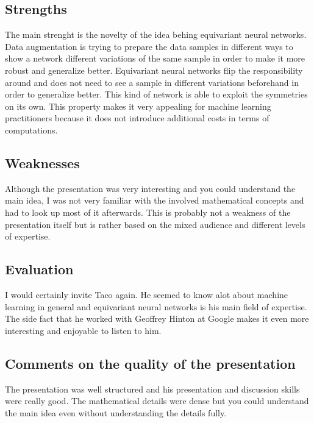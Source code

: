 \documentclass[a4paper]{article}
\begin{document}
\subsection{Strengths}

The main strenght is the novelty of the idea behing equivariant neural networks. Data augmentation is trying to prepare the data samples in different ways to show a network different variations of the same sample in order to make it more robust and generalize better. Equivariant neural networks flip the responsibility around and does not need to see a sample in different variations beforehand in order to generalize better. This kind of network is able to exploit the symmetries on its own. This property makes it very appealing for machine learning practitioners because it does not introduce additional costs in terms of computations.

\subsection{Weaknesses}

Although the presentation was very interesting and you could understand the main idea, I was not very familiar with the involved mathematical concepts and had to look up most of it afterwards. This is probably not a weakness of the presentation itself but is rather based on the mixed audience and different levels of expertise.

\subsection{Evaluation}

I would certainly invite Taco again. He seemed to know alot about machine learning in general and equivariant neural networks is his main field of expertise. The side fact that he worked with Geoffrey Hinton at Google makes it even more interesting and enjoyable to listen to him. 

\subsection{Comments on the quality of the presentation}

The presentation was well structured and his presentation and discussion skills were really good. The mathematical details were dense but you could understand the main idea even without understanding the details fully.


 
\end{document}
